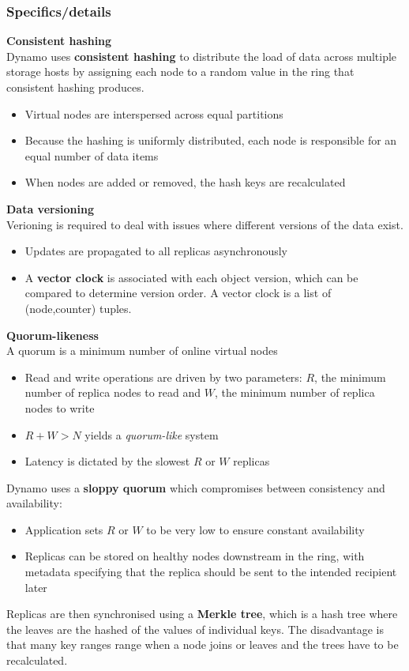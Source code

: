 \documentclass{sty/SizheArticle}
\begin{document}
\subsubsection{Specifics/details}
\textbf{Consistent hashing} \\
Dynamo uses \textbf{consistent hashing} to distribute the load of data across
multiple storage hosts by assigning each node to a random value in the ring
that consistent hashing produces.
\begin{itemize}
\item Virtual nodes are interspersed across equal partitions
\item Because the hashing is uniformly distributed, each node is responsible
for an equal number of data items
\item When nodes are added or removed, the hash keys are recalculated
\end{itemize}

\textbf{Data versioning} \\
Verioning is required to deal with issues where different versions of the data
exist.
\begin{itemize}
\item Updates are propagated to all replicas asynchronously
\item A \textbf{vector clock} is associated with each object version, which can be
compared to determine version order. A vector clock is a list of (node,counter)
tuples.
\end{itemize}

\textbf{Quorum-likeness} \\
A quorum is a minimum number of online virtual nodes
\begin{itemize}
\item Read and write operations are driven by two parameters: $R$, the minimum
number of replica nodes to read and $W$, the minimum number of replica nodes
to write
\item $R + W > N$ yields a \textit{quorum-like} system
\item Latency is dictated by the slowest $R$ or $W$ replicas 
\end{itemize}
Dynamo uses a \textbf{sloppy quorum} which compromises between consistency
and availability:
\begin{itemize}
\item Application sets $R$ or $W$ to be very low to ensure constant
availability
\item Replicas can be stored on healthy nodes downstream in the ring, with
metadata specifying that the replica should be sent to the intended recipient
later
\end{itemize}
Replicas are then synchronised using a \textbf{Merkle tree}, which is a hash
tree where the leaves are the hashed of the values of individual keys. The
disadvantage is that many key ranges range when a node joins or leaves and the
trees have to be recalculated.
\end{document}
